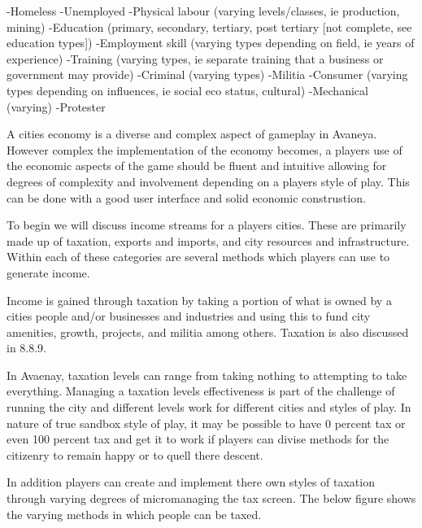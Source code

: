 -Homeless
-Unemployed
-Physical labour (varying levels/classes, ie production, mining)
-Education (primary, secondary, tertiary, post tertiary [not complete, see education types])
-Employment skill (varying types depending on field, ie years of experience)
-Training (varying types, ie separate training that a business or government may provide)
-Criminal (varying types)
-Militia
-Consumer (varying types depending on influences, ie social eco status, cultural)
-Mechanical (varying) 
-Protester





A cities economy is a diverse and complex aspect of gameplay in Avaneya. However complex the implementation of the economy becomes, a players use of the economic aspects of the game should be fluent and intuitive allowing for degrees of complexity and involvement depending on a players style of play. This can be done with a good user interface and solid economic construstion. 

To begin we will discuss income streams for a players cities. These are primarily made up of taxation, exports and imports, and city resources and infrastructure. Within each of these categories are several methods which players can use to generate income.


Income is gained through taxation by taking a portion of what is owned by a cities people and/or businesses and industries and using this to fund city amenities, growth, projects, and militia among others. Taxation is also discussed in 8.8.9.

In Avaenay, taxation levels can range from taking nothing to attempting to take everything. Managing a taxation levels effectiveness is part of the challenge of running the city and different levels work for different cities and styles of play. In nature of true sandbox style of play, it may be possible to have 0 percent tax or even 100 percent tax and get it to work if players can divise methods for the citizenry to remain happy or to quell there descent. 

In addition players can create and implement there own styles of taxation through varying degrees of micromanaging the tax screen. The below figure shows the varying methods in which people can be taxed.

